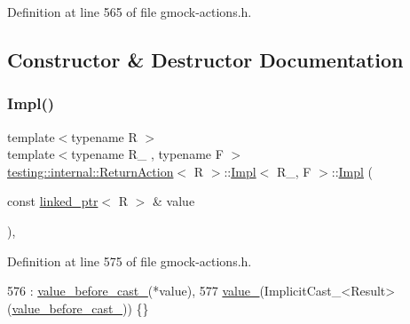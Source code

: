 Definition at line 565 of file gmock-\/actions.\+h.



\subsection{Constructor \& Destructor Documentation}
\mbox{\label{classtesting_1_1internal_1_1ReturnAction_1_1Impl_afde6b8872e55f42ee105fb70b3ceccb2}} 
\subsubsection{\texorpdfstring{Impl()}{Impl()}}
{\footnotesize\ttfamily template$<$typename R $>$ \\
template$<$typename R\+\_\+ , typename F $>$ \\
\hyperlink{classtesting_1_1internal_1_1ReturnAction}{testing\+::internal\+::\+Return\+Action}$<$ R $>$\+::\hyperlink{classtesting_1_1internal_1_1ReturnAction_1_1Impl}{Impl}$<$ R\+\_\+, F $>$\+::\hyperlink{classtesting_1_1internal_1_1ReturnAction_1_1Impl}{Impl} (\begin{DoxyParamCaption}\item[{const \hyperlink{classtesting_1_1internal_1_1linked__ptr}{linked\+\_\+ptr}$<$ R $>$ \&}]{value }\end{DoxyParamCaption})\hspace{0.3cm}{\ttfamily [inline]}, {\ttfamily [explicit]}}



Definition at line 575 of file gmock-\/actions.\+h.


\begin{DoxyCode}
576         : \hyperlink{classtesting_1_1internal_1_1ReturnAction_1_1Impl_a0dbd2f08128302c1395063f84f661366}{value\_before\_cast\_}(*value),
577           \hyperlink{classtesting_1_1internal_1_1ReturnAction_1_1Impl_a75916c30e7f8bb0388f3313788f25fa5}{value\_}(ImplicitCast\_<Result>(\hyperlink{classtesting_1_1internal_1_1ReturnAction_1_1Impl_a0dbd2f08128302c1395063f84f661366}{value\_before\_cast\_})) \{\}
\end{DoxyCode}


